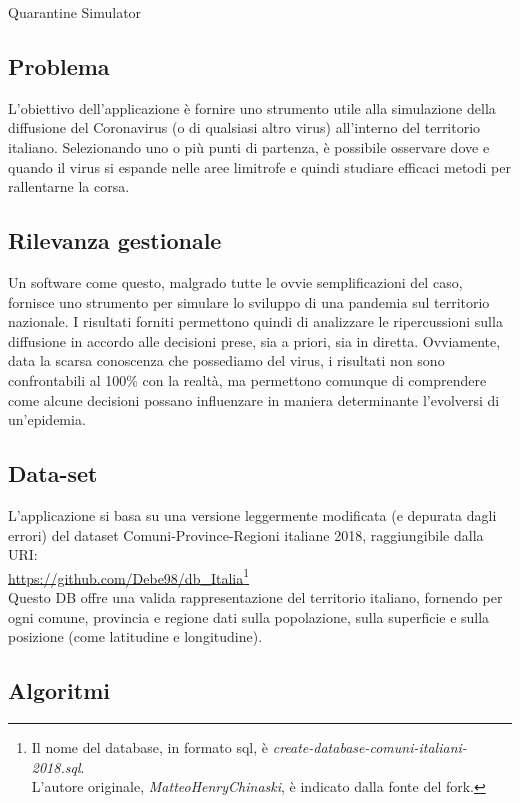 \documentclass[a4paper, 12pt]{article}
\begin{document}
	Quarantine Simulator
	
	\subsection{Problema}
	
	L'obiettivo dell'applicazione è fornire uno strumento utile alla simulazione della diffusione del Coronavirus (o di qualsiasi altro virus) all'interno del territorio italiano.
	Selezionando uno o più punti di partenza, è possibile osservare dove e quando il virus si espande nelle aree limitrofe e quindi studiare efficaci metodi per rallentarne la corsa.
	
	\subsection{Rilevanza gestionale}
	
	Un software come questo, malgrado tutte le ovvie semplificazioni del caso, fornisce uno strumento per simulare lo sviluppo di una pandemia sul territorio nazionale.
	I risultati forniti permettono quindi di analizzare le ripercussioni sulla diffusione in accordo alle decisioni prese, sia a priori, sia in diretta.
	Ovviamente, data la scarsa conoscenza che possediamo del virus, i risultati non sono confrontabili al 100\% con la realtà, ma permettono comunque di comprendere come alcune decisioni possano influenzare in maniera determinante l'evolversi di un'epidemia.
	
	\subsection{Data-set}
	\label{sub:db}
	
	L'applicazione si basa su una versione leggermente modificata (e depurata dagli errori) del dataset Comuni-Province-Regioni italiane 2018, raggiungibile dalla URI:\\
	\url{https://github.com/Debe98/db_Italia}\footnote{Il nome del database, in formato sql, è  \emph{create-database-comuni-italiani-2018.sql}.\\
	L'autore originale, \emph{MatteoHenryChinaski}, è indicato dalla fonte del fork.}\\
	Questo DB offre una valida rappresentazione del territorio italiano, fornendo per ogni comune, provincia e regione dati sulla popolazione, sulla superficie e sulla posizione (come latitudine e longitudine).

	\subsection{Algoritmi}
	
\end{document}
